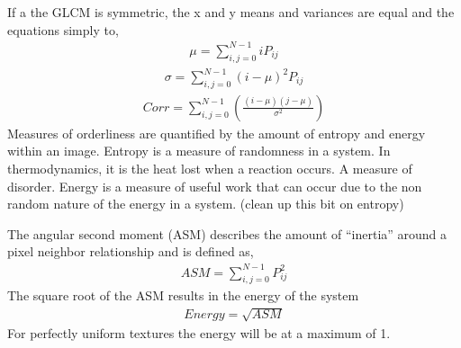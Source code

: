 %
If a the GLCM is symmetric, the x and y means and variances are equal and the equations simply to,
%
\begin{align}
    \mu = \sum_{i,j=0}^{N-1}iP_{ij}
\end{align}
\begin{align}
    \sigma = \sum_{i,j=0}^{N-1}(i-\mu)^2P_{ij}
\end{align}
\begin{align}
    Corr = \sum_{i,j=0}^{N-1}(\frac{(i-\mu)(j-\mu)}{\sigma^2})
\end{align}
%
Measures of orderliness are quantified by the amount of entropy and energy within an image.  Entropy is a measure of randomness in a system.  In thermodynamics, it is the heat lost when a reaction occurs. A measure of disorder.  Energy is a measure of useful work that can occur due to the non random nature of the energy in a system. (clean up this bit on entropy)

The angular second moment (ASM) describes the amount of “inertia” around a pixel neighbor relationship and is defined as,
%
\begin{align}
    ASM = \sum_{i,j=0}^{N-1}P_{ij}^2
\end{align}
%
The square root of the ASM results in the energy of the system
%
\begin{align}
    Energy = \sqrt{ASM}
\end{align}
%
For perfectly uniform textures the energy will be at a maximum of 1.
